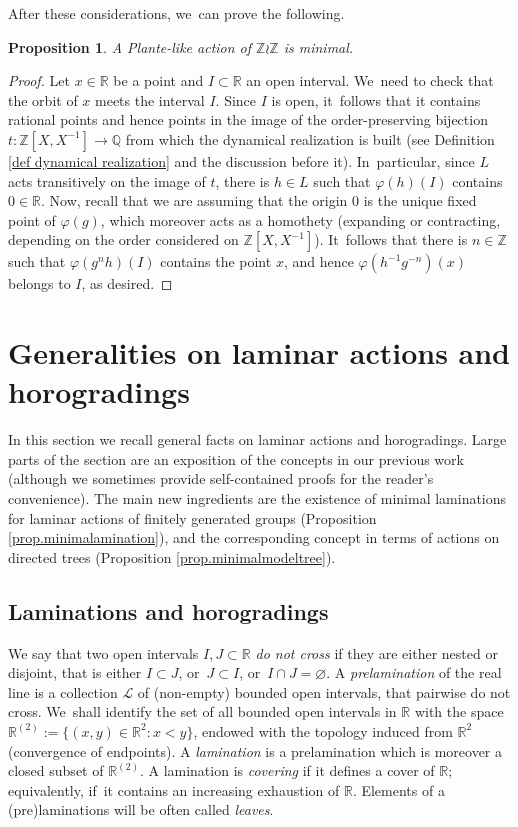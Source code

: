 \documentclass[JEP,XML,SOM,Unicode,NoFloatCountersInSection,published]{cedram}
\newtheorem{prop}[thm]{Proposition}
\theoremstyle{definition}
\newcommand{\R}{\mathbb{R}}
\newcommand{\Q}{\mathbb Q}
\newcommand{\Z}{\mathbb Z}
\newcommand{\Lcal}{\mathcal{L}}
\begin{document}
After these considerations, we~can prove the following.

\begin{prop} A Plante-like action of $\Z\wr\Z$ is minimal.
\label{prop Plante-like minimal}
\end{prop}

\begin{proof} Let $x\in \R$ be a point and $I\subset \R$ an open interval. We~need to check that the orbit of $x$ meets the interval $I$.
Since $I$ is open, it~follows that it contains rational points and hence points in the image of the order-preserving bijection $t\colon \Z[X,X^{-1}]\to \Q$ from which the dynamical realization is built (see Definition \ref{def dynamical realization} and the discussion before it). In~particular, since $L$ acts transitively on the image of $t$, there is $h\in L$ such that $\varphi(h)(I)$ contains $0\in \R$. Now, recall that we are assuming that the origin $0$ is the unique fixed point of $\varphi(g)$, which moreover acts as a homothety (expanding or contracting, depending on the order considered on $\Z[X,X^{-1}]$). It~follows that there is $n\in \Z$ such that $\varphi(g^nh)(I)$ contains the point $x$, and hence $\varphi(h^{-1}g^{-n})(x)$ belongs to $I$, as desired.
\end{proof}

\section{Generalities on laminar actions and horogradings}
\label{sec generalities}

In this section we recall general facts on laminar actions and horogradings. Large parts of the section are an exposition of the concepts in our previous work \cite[Chap.\,8 \& 11]{BMRT} (although we sometimes provide self-contained proofs for the reader's convenience). The main new ingredients are the existence of minimal laminations for laminar actions of finitely generated groups (Proposition \ref{prop.minimalamination}), and the corresponding concept in terms of actions on directed trees (Proposition \ref{prop.minimalmodeltree}).

\subsection{Laminations and horogradings}

We say that two open intervals $I,J\subset \R$ \emph{do not cross} if they are either nested or disjoint, that is either $I\subset J$, or~$J\subset I$, or~$I\cap J=\varnothing$. A \emph{prelamination} of the real line is a collection $\Lcal$ of (non-empty) bounded open intervals, that pairwise do not cross. We~shall identify the set of all bounded open intervals in $\R$ with the space $\R^{(2)}:=\{(x, y)\in \R^2: x<y\}$, endowed with the topology induced from $\R^2$ (\ie convergence of endpoints). A \emph{lamination} is a prelamination which is moreover a closed subset of $\R^{(2)}$. A lamination is \emph{covering} if it defines a cover of $\R$; equivalently, if~it contains an increasing exhaustion of $\R$. Elements of a (pre)laminations will be often called \emph{leaves}.
\end{document}
